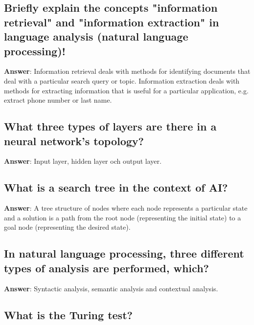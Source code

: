 \documentclass[a4paper,11pt,oneside]{article}
\begin{document}
\begin{sloppypar}
\subsection{Briefly explain the concepts "information retrieval" and "information extraction" in language analysis (natural language processing)!}

\label{q:318:sa:en:True}

\textbf{Answer}: Information retrieval deals with methods for identifying documents that deal with a particular search query or topic. Information extraction deals with methods for extracting information that is useful for a particular application, e.g. extract phone number or last name.



\subsection{What three types of layers are there in a neural network's topology?}

\label{q:319:sa:en:True}

\textbf{Answer}: Input layer, hidden layer och output layer.



\subsection{What is a search tree in the context of AI?}

\label{q:320:sa:en:True}

\textbf{Answer}: A tree structure of nodes where each node represents a particular state and a solution is a path from the root node (representing the initial state) to a goal node (representing the desired state).



\subsection{In natural language processing, three different types of analysis are performed, which?}

\label{q:321:sa:en:True}

\textbf{Answer}: Syntactic analysis, semantic analysis and contextual analysis.



\subsection{What is the Turing test?}


\end{sloppypar}
\end{document}
